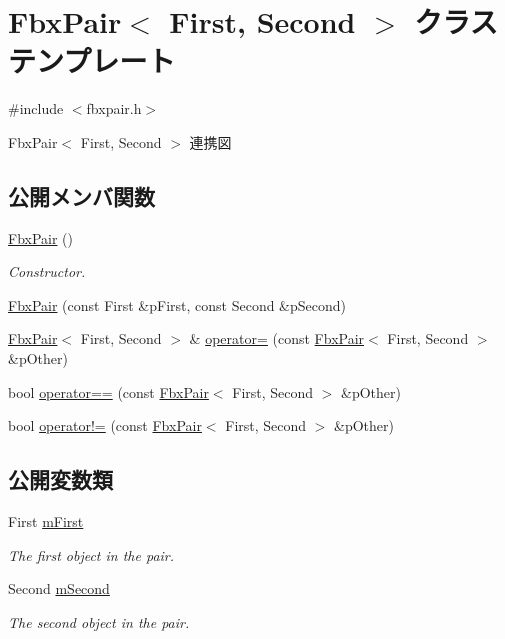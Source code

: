 \hypertarget{class_fbx_pair}{}\section{Fbx\+Pair$<$ First, Second $>$ クラステンプレート}
\label{class_fbx_pair}


{\ttfamily \#include $<$fbxpair.\+h$>$}



Fbx\+Pair$<$ First, Second $>$ 連携図
\subsection*{公開メンバ関数}
\begin{DoxyCompactItemize}
\item 
\hyperlink{class_fbx_pair_ae542e6310c76b51c6208724fb18f3b96}{Fbx\+Pair} ()
\begin{DoxyCompactList}\small\item\em Constructor. \end{DoxyCompactList}\item 
\hyperlink{class_fbx_pair_a7e8efc2156e23d213128de686aba4def}{Fbx\+Pair} (const First \&p\+First, const Second \&p\+Second)
\item 
\hyperlink{class_fbx_pair}{Fbx\+Pair}$<$ First, Second $>$ \& \hyperlink{class_fbx_pair_ab645f08678477ba9b74c08ff5d61bf52}{operator=} (const \hyperlink{class_fbx_pair}{Fbx\+Pair}$<$ First, Second $>$ \&p\+Other)
\item 
bool \hyperlink{class_fbx_pair_a9ada9f26dbcfd8e26b4e6df741436824}{operator==} (const \hyperlink{class_fbx_pair}{Fbx\+Pair}$<$ First, Second $>$ \&p\+Other)
\item 
bool \hyperlink{class_fbx_pair_a6a08f9caa08c3bdd093951eeeaed31bf}{operator!=} (const \hyperlink{class_fbx_pair}{Fbx\+Pair}$<$ First, Second $>$ \&p\+Other)
\end{DoxyCompactItemize}
\subsection*{公開変数類}
\begin{DoxyCompactItemize}
\item 
First \hyperlink{class_fbx_pair_ae4207e9014fead320362025388c70703}{m\+First}
\begin{DoxyCompactList}\small\item\em The first object in the pair. \end{DoxyCompactList}\item 
Second \hyperlink{class_fbx_pair_ade45092061639a0a4256a0df59365d47}{m\+Second}
\begin{DoxyCompactList}\small\item\em The second object in the pair. \end{DoxyCompactList}\end{DoxyCompactItemize}


